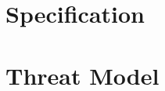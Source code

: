 \appendix
\newpage
\section{Specification}


\section{Threat Model}
\label{sec:threat-model-appendix}
